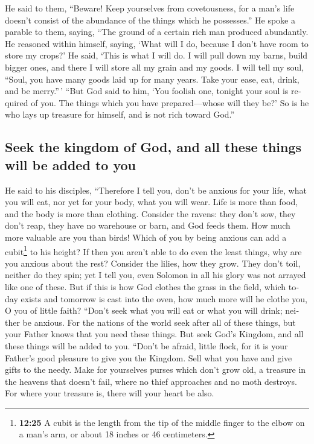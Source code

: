 \begin{paracol}{2}
\begin{otherlanguage}{english}
 He said to them, ``Beware! Keep yourselves from
covetousness, for a man's life doesn't consist of the abundance of the
things which he possesses.''  He spoke a parable to them,
saying, ``The ground of a certain rich man produced abundantly.
 He reasoned within himself, saying, `What will I do,
because I don't have room to store my crops?'  He said,
`This is what I will do. I will pull down my barns, build bigger ones,
and there I will store all my grain and my goods.  I will
tell my soul, ``Soul, you have many goods laid up for many years. Take
your ease, eat, drink, and be merry.''\,'  ``But God said
to him, `You foolish one, tonight your soul is required of you. The
things which you have prepared---whose will they be?'  So
is he who lays up treasure for himself, and is not rich toward God.''

\hypertarget{seek-the-kingdom-of-god-and-all-these-things-will-be-added-to-you}{%
\subsection{Seek the kingdom of God, and all these things will be added
to
you}\label{seek-the-kingdom-of-god-and-all-these-things-will-be-added-to-you}}

 He said to his disciples, ``Therefore I tell you, don't
be anxious for your life, what you will eat, nor yet for your body, what
you will wear.  Life is more than food, and the body is
more than clothing.  Consider the ravens: they don't sow,
they don't reap, they have no warehouse or barn, and God feeds them. How
much more valuable are you than birds!  Which of you by
being anxious can add a cubit\footnote{\textbf{12:25} A cubit is the
  length from the tip of the middle finger to the elbow on a man's arm,
  or about 18 inches or 46 centimeters.} to his height? 
If then you aren't able to do even the least things, why are you anxious
about the rest?  Consider the lilies, how they grow. They
don't toil, neither do they spin; yet I tell you, even Solomon in all
his glory was not arrayed like one of these.  But if this
is how God clothes the grass in the field, which today exists and
tomorrow is cast into the oven, how much more will he clothe you, O you
of little faith?  ``Don't seek what you will eat or what
you will drink; neither be anxious.  For the nations of
the world seek after all of these things, but your Father knows that you
need these things.  But seek God's Kingdom, and all these
things will be added to you.  ``Don't be afraid, little
flock, for it is your Father's good pleasure to give you the Kingdom.
 Sell what you have and give gifts to the needy. Make for
yourselves purses which don't grow old, a treasure in the heavens that
doesn't fail, where no thief approaches and no moth destroys.
 For where your treasure is, there will your heart be
also.


\end{otherlanguage}
\end{paracol}
